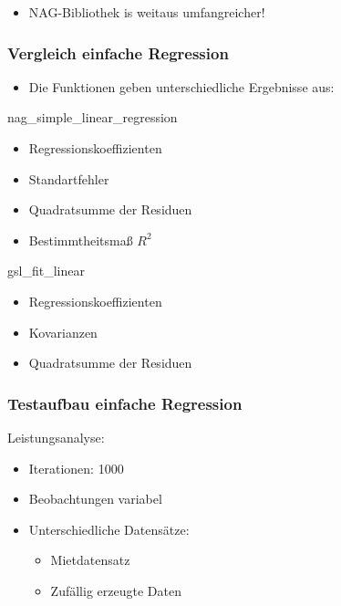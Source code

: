 \documentclass{beamer}
\begin{document}
\begin{frame}
  \pause\pause\pause\pause\pause\pause

  \begin{itemize}
  \item NAG-Bibliothek is weitaus umfangreicher! 
  \end{itemize}

\end{frame}

\begin{frame}
  \frametitle{Vergleich einfache Regression}
  
  \begin{itemize}
  \item Die Funktionen geben unterschiedliche Ergebnisse aus:
  \end{itemize}

  \begin{block}{nag\_simple\_linear\_regression}
    \begin{itemize}
    \item Regressionskoeffizienten
    \item Standartfehler
    \item Quadratsumme der Residuen
    \item Bestimmtheitsmaß $R^2$
    \end{itemize}
  \end{block}

  \begin{block}{gsl\_fit\_linear}
    \begin{itemize}
    \item Regressionskoeffizienten
    \item Kovarianzen
    \item Quadratsumme der Residuen
    \end{itemize}
  \end{block}

\end{frame}

\begin{frame}
  \frametitle{Testaufbau einfache Regression}

  \begin{block}{Leistungsanalyse:}
    \begin{itemize}
    \item Iterationen: 1000
    \item Beobachtungen variabel
    \item Unterschiedliche Datensätze:
      \begin{itemize}
      \item Mietdatensatz
      \item Zufällig erzeugte Daten
      \end{itemize}
    \end{itemize}
  \end{block}

\end{frame}
\end{document}
